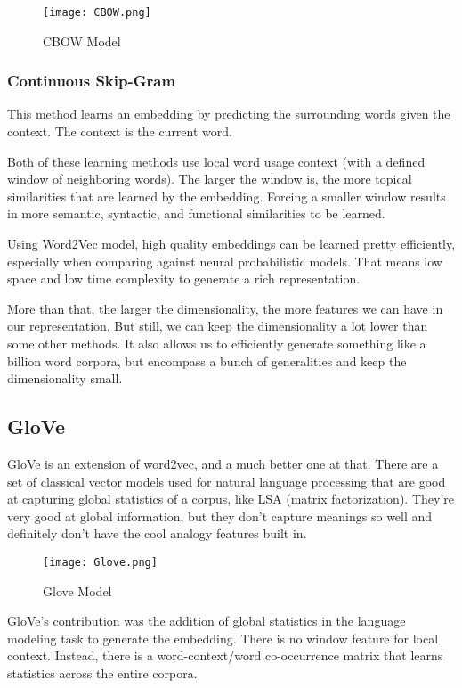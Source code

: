 \begin{figure}[h]
    \centering
    \texttt{[image: CBOW.png]}
    \caption{CBOW Model}
    \label{fig:CBOW}
\end{figure}


\subsubsection{Continuous Skip-Gram}
This method learns an embedding by predicting the surrounding words given the context. The context is the current word.

Both of these learning methods use local word usage context (with a defined window of neighboring words). The larger the window is, the more topical similarities that are learned by the embedding. Forcing a smaller window results in more semantic, syntactic, and functional similarities to be learned.

Using Word2Vec model, high quality embeddings can be learned pretty efficiently, especially when comparing against neural probabilistic models. That means low space and low time complexity to generate a rich representation.

More than that, the larger the dimensionality, the more features we can have in our representation. But still, we can keep the dimensionality a lot lower than some other methods. It also allows us to efficiently generate something like a billion word corpora, but encompass a bunch of generalities and keep the dimensionality small.


\subsection{GloVe}
GloVe is an extension of word2vec, and a much better one at that. There are a set of classical vector models used for natural language processing that are good at capturing global statistics of a corpus, like LSA (matrix factorization). They\rq re very good at global information, but they don\rq t capture meanings so well and definitely don\rq t have the cool analogy features built in.

\begin{figure}[H]
    \centering
    \texttt{[image: Glove.png]}
    \caption{Glove Model}
    \label{fig:Glove}
\end{figure}

GloVe\rq s contribution was the addition of global statistics in the language modeling task to generate the embedding. There is no window feature for local context. Instead, there is a word-context/word co-occurrence matrix that learns statistics across the entire corpora.



